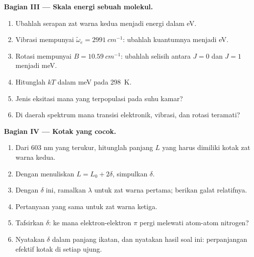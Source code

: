 \begin{problem}
\medskip\noindent\textbf{Bagian III --- Skala energi sebuah molekul.}
\begin{enumerate}[resume, beginpenalty=10000]
  \item Ubahlah serapan zat warna kedua menjadi energi dalam eV.
  \item Vibrasi  mempunyai $\tilde\omega_e = \qty{2991}{cm^{-1}}$:
        ubahlah kuantumnya menjadi eV.
  \item Rotasi  mempunyai $B = \qty{10.59}{cm^{-1}}$: ubahlah
        selisih antara $J = 0$ dan $J = 1$ menjadi meV.
  \item Hitunglah $kT$ dalam meV pada \qty{298}{K}.
  \item Jenis eksitasi mana yang terpopulasi pada suhu kamar?
  \item Di daerah spektrum mana transisi elektronik, vibrasi, dan rotasi
        teramati?
\end{enumerate}

\medskip\noindent\textbf{Bagian IV --- Kotak yang cocok.}
\begin{enumerate}[resume, beginpenalty=10000]
  \item Dari 603 nm yang terukur, hitunglah panjang $L$ yang harus dimiliki
        kotak zat warna kedua.
  \item Dengan menuliskan $L = L_0 + 2\delta$, simpulkan $\delta$.
  \item Dengan $\delta$ ini, ramalkan $\lambda$ untuk zat warna pertama;
        berikan galat relatifnya.
  \item Pertanyaan yang sama untuk zat warna ketiga.
  \item Tafsirkan $\delta$: ke mana elektron-elektron $\pi$ pergi melewati
        atom-atom nitrogen?
  \item Nyatakan $\delta$ dalam panjang ikatan, dan nyatakan hasil soal
        ini: perpanjangan efektif kotak di setiap ujung.
\end{enumerate}
\end{problem}
